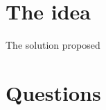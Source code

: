 \section{The idea}

\begin{frame}{The solution proposed}

\end{frame}
%
%
%
%
%
%
%
%
%


\section
  {Questions}

